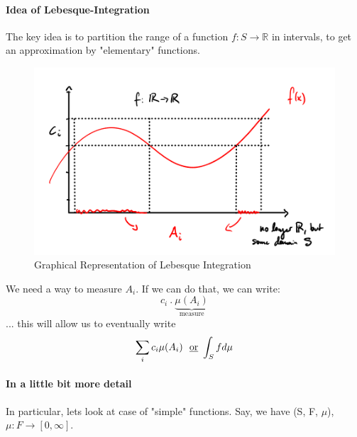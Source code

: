 \documentclass[10pt,a4paper]{article}
\theoremstyle{definition}
\theoremstyle{plain}
\begin{document}
\paragraph{Idea of Lebesque-Integration} The key idea is to partition the range of a function $f: S \to \mathbb{R}$ in intervals, to get an approximation by "elementary" functions.
\begin{figure}[H]
	\centering
	\includegraphics[width=0.7\linewidth]{lebesque_idea}
	\caption{Graphical Representation of Lebesque Integration}
	\label{fig:lebesqueidea}
\end{figure}
We need a way to measure $A_i$. If we can do that, we can write:
$$ c_{i} \ . \ \underbrace{\mu(A_i)}_{\text{measure}}$$
... this will allow us to eventually write
$$ \sum_{i} c_i \mu(A_i) \ \text{  \underline{or}  }  \int_{S}f d\mu$$

\paragraph{In a little bit more detail} In particular, lets look at case of "simple" functions. Say, we have (S, F, $\mu$), $\mu: F \to [0, \infty]$.
\end{document}
